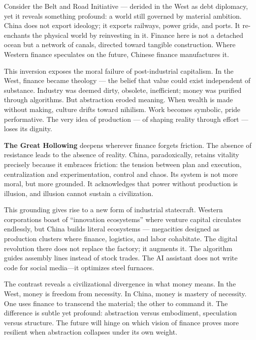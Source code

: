 \documentclass[11pt,twoside]{book}
\begin{document}
Consider the Belt and Road Initiative — derided in the West as debt diplomacy, yet it reveals something profound: a world still governed by material ambition.  China does not export ideology; it exports railways, power grids, and ports.  It re-enchants the physical world by reinvesting in it.  Finance here is not a detached ocean but a network of canals, directed toward tangible construction.  Where Western finance speculates on the future, Chinese finance manufactures it.

This inversion exposes the moral failure of post-industrial capitalism.  In the West, finance became theology — the belief that value could exist independent of substance.  Industry was deemed dirty, obsolete, inefficient; money was purified through algorithms.  But abstraction eroded meaning.  When wealth is made without making, culture drifts toward nihilism.  Work becomes symbolic, pride performative.  The very idea of production — of shaping reality through effort — loses its dignity.

\textbf{The Great Hollowing} deepens wherever finance forgets friction.  The absence of resistance leads to the absence of reality.  China, paradoxically, retains vitality precisely because it embraces friction: the tension between plan and execution, centralization and experimentation, control and chaos.  Its system is not more moral, but more grounded.  It acknowledges that power without production is illusion, and illusion cannot sustain a civilization.

This grounding gives rise to a new form of industrial statecraft.  Western corporations boast of “innovation ecosystems” where venture capital circulates endlessly, but China builds literal ecosystems — megacities designed as production clusters where finance, logistics, and labor cohabitate.  The digital revolution there does not replace the factory; it augments it.  The algorithm guides assembly lines instead of stock trades.  The AI assistant does not write code for social media—it optimizes steel furnaces.

The contrast reveals a civilizational divergence in what money means.  In the West, money is freedom from necessity.  In China, money is mastery of necessity.  One uses finance to transcend the material; the other to command it.  The difference is subtle yet profound: abstraction versus embodiment, speculation versus structure.  The future will hinge on which vision of finance proves more resilient when abstraction collapses under its own weight.
\end{document}
